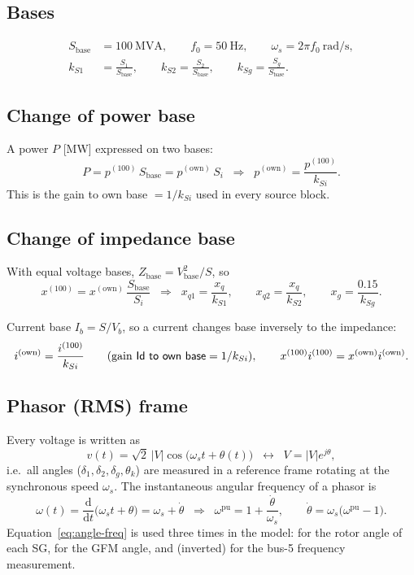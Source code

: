 \documentclass[11pt,a4paper]{article}
\numberwithin{equation}{section}
\newcommand{\dd}{\mathrm{d}}
\newcommand{\blk}[1]{\textsf{#1}}
\begin{document}
\subsection{Bases}
\begin{align}
S_{\text{base}} &= 100~\text{MVA}, \qquad f_0 = 50~\text{Hz}, \qquad \omega_s = 2\pi f_0~\text{rad/s},\\
k_{S1} &= \frac{S_1}{S_{\text{base}}},\qquad k_{S2} = \frac{S_2}{S_{\text{base}}},\qquad k_{Sg} = \frac{S_g}{S_{\text{base}}}.
\end{align}

\subsection{Change of power base}
A power $P$ [MW] expressed on two bases:
\begin{equation}
P = p^{(100)}\,S_{\text{base}} = p^{(\text{own})}\,S_i
\;\;\Longrightarrow\;\;
p^{(\text{own})} = \frac{p^{(100)}}{k_{Si}} .
\end{equation}
This is the gain \blk{to own base} $=1/k_{Si}$ used in every source block.

\subsection{Change of impedance base}
With equal voltage bases, $Z_{\text{base}} = V_{\text{base}}^2/S$, so
\begin{equation}
x^{(100)} = x^{(\text{own})}\,\frac{S_{\text{base}}}{S_i}
\;\;\Longrightarrow\;\;
x_{q1} = \frac{x_q}{k_{S1}},\qquad x_{q2} = \frac{x_q}{k_{S2}},\qquad x_g = \frac{0.15}{k_{Sg}} .
\end{equation}

Current base $I_b = S/V_b$, so a current changes base inversely to the impedance:
\begin{equation}
i^{(\text{own})} = \frac{i^{(100)}}{k_{Si}}\qquad(\text{gain \blk{Id to own base}} = 1/k_{Si}),
\qquad x^{(100)}i^{(100)} = x^{(\text{own})}i^{(\text{own})}.
\end{equation}

\subsection{Phasor (RMS) frame}
Every voltage is written as
\begin{equation}
v(t) = \sqrt{2}\,|V|\cos\!\big(\omega_s t + \theta(t)\big)
\;\;\longleftrightarrow\;\;
V = |V|e^{j\theta},
\end{equation}
i.e.\ all angles ($\delta_1,\delta_2,\delta_g,\theta_k$) are measured in a reference frame rotating at the synchronous speed $\omega_s$.
The instantaneous angular frequency of a phasor is
\begin{equation}
\omega(t) = \frac{\dd}{\dd t}\big(\omega_s t + \theta\big) = \omega_s + \dot\theta
\;\;\Longrightarrow\;\;
\omega^{\text{pu}} = 1 + \frac{\dot\theta}{\omega_s},
\qquad
\dot\theta = \omega_s\big(\omega^{\text{pu}} - 1\big).
\label{eq:angle-freq}
\end{equation}
Equation~\eqref{eq:angle-freq} is used three times in the model: for the rotor angle of each SG, for the GFM angle, and (inverted) for the bus-5 frequency measurement.
\end{document}
